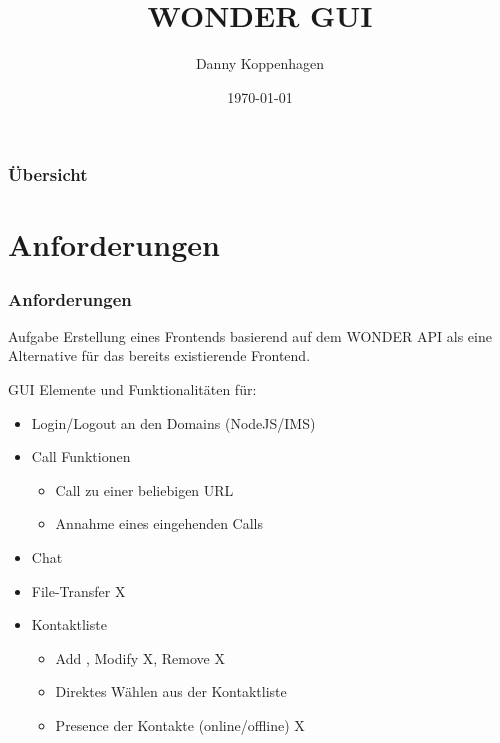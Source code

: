 \documentclass{beamer}
\title[WONDER GUI]{WONDER GUI} %
\author{Danny Koppenhagen} %
\institute[UCLA] %
{
Hochschule für Telekommunikation Leipzig \\ %
\medskip
\textit{Danny.Koppenhagen@hft-leipzig.de} %
}
\date{\today} %
\begin{document}
	\begin{frame}
		\titlepage %
	\end{frame}

	\begin{frame}
		\frametitle{Übersicht} %
		\tableofcontents %
	\end{frame}

\section{Anforderungen}
	\begin{frame}
		\frametitle{Anforderungen}
		\begin{block}{Aufgabe}
		Erstellung eines Frontends basierend auf dem WONDER API als eine
		Alternative
		für das bereits existierende Frontend.
		\end{block}
		\pause
		GUI Elemente und Funktionalitäten für:
		\begin{itemize}[<+->]
			\item Login/Logout  an den Domains (NodeJS/IMS)
			\color[rgb]{0,0.8,0}\checkmark
			\item Call Funktionen \color[rgb]{0,0.8,0}\checkmark
			\begin{itemize}[<2->]
				\item Call zu einer beliebigen URL
				\item Annahme eines eingehenden Calls
			\end{itemize}
			\item Chat \color[rgb]{0,0.8,0}\checkmark
			\item File-Transfer {\color[rgb]{0.8,0,0} X}
			\item Kontaktliste
			\begin{itemize}[<6->]
				\item Add {\color[rgb]{0,0.8,0}\checkmark},
				Modify {\color[rgb]{0.8,0,0} X}, Remove {\color[rgb]{0.8,0,0} X}
				\item Direktes Wählen aus der Kontaktliste
				{\color[rgb]{0,0.8,0}\checkmark}
				\item Presence der Kontakte (online/offline)
				{\color[rgb]{0.8,0,0} X}
			\end{itemize}
		\end{itemize}
	\end{frame}
\end{document}

